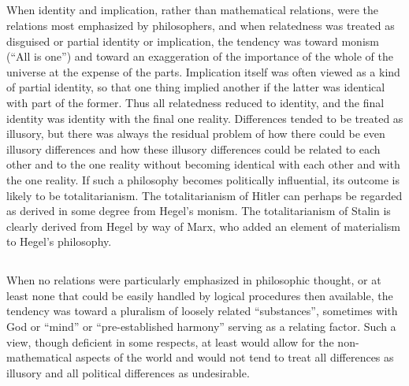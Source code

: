 \documentclass{book}
\begin{document}
\subsection{}
\label{sec:1.4}

When identity and implication, rather than mathematical relations, were the relations most emphasized by philosophers, and when relatedness was treated as disguised or partial identity or implication, the tendency was toward monism (“All is one”) and toward an exaggeration of the importance of the whole of the universe at the expense of the parts.  Implication itself was often viewed as a kind of partial identity, so that one thing implied another if the latter was identical with part of the former.  Thus all relatedness reduced to identity, and the final identity was identity with the final one reality.  Differences tended to be treated as illusory, but there was always the residual problem of how there could be even illusory differences and how these illusory differences could be related to each other and to the one reality without becoming identical with each other and with the one reality.  If such a philosophy becomes politically influential, its outcome is likely to be totalitarianism.  The totalitarianism of Hitler can perhaps be regarded as derived in some degree from Hegel's monism.  The totalitarianism of Stalin is clearly derived from Hegel by way of Marx, who added an element of materialism to Hegel's philosophy.

\subsection{}
\label{sec:1.5}

When no relations were particularly emphasized in philosophic thought, or at least none that could be easily handled by logical procedures then available, the tendency was toward a pluralism of loosely related “substances”, sometimes with God or “mind” or “pre-established harmony” serving as a relating factor.  Such a view, though deficient in some respects, at least would allow for the non-mathematical aspects of the world and would not tend to treat all differences as illusory and all political differences as undesirable.

\subsection{}
\label{sec:1.6}
\end{document}
